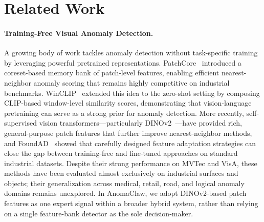\section{Related Work}
\label{sec:related}

\paragraph{Training-Free Visual Anomaly Detection.}
A growing body of work tackles anomaly detection without task-specific training by leveraging powerful pretrained representations.
PatchCore~\cite{roth2022patchcore} introduced a coreset-based memory bank of patch-level features, enabling efficient nearest-neighbor anomaly scoring that remains highly competitive on industrial benchmarks.
WinCLIP~\cite{jeong2023winclip} extended this idea to the zero-shot setting by composing CLIP-based window-level similarity scores, demonstrating that vision-language pretraining can serve as a strong prior for anomaly detection.
More recently, self-supervised vision transformers---particularly DINOv2~\cite{oquab2024dinov2}---have provided rich, general-purpose patch features that further improve nearest-neighbor methods, and FoundAD~\cite{li2026foundad} showed that carefully designed feature adaptation strategies can close the gap between training-free and fine-tuned approaches on standard industrial datasets.
Despite their strong performance on MVTec and VisA, these methods have been evaluated almost exclusively on industrial surfaces and objects; their generalization across medical, retail, road, and logical anomaly domains remains unexplored.
In AnomaClaw, we adopt DINOv2-based patch features as one expert signal within a broader hybrid system, rather than relying on a single feature-bank detector as the sole decision-maker.

